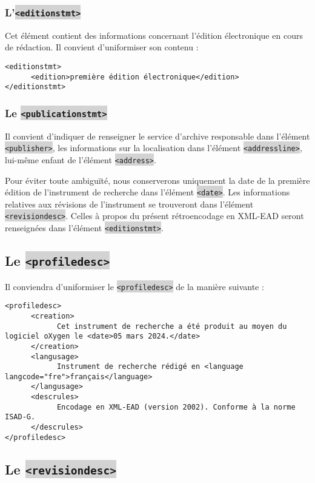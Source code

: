 \documentclass[hidelinks, 13pt]{report}
\newcommand{\code}[1]{\colorbox{LightGray}{\texttt{#1}}}
\begin{document}
	\subsubsection{L'\code{<editionstmt>}}

	Cet élément contient des informations concernant l'édition électronique en cours de rédaction. Il convient d'uniformiser son contenu :
	
\begin{lstlisting}[language=EAD]
<editionstmt>
      <edition>première édition électronique</edition>
</editionstmt>
\end{lstlisting}

	\subsubsection{Le \code{<publicationstmt>}}

	Il convient d'indiquer de renseigner le service d'archive responsable dans l'élément \code{<publisher>}, les informations sur la localisation dans l'élément \code{<addressline>}, lui-même enfant de l'élément \code{<address>}.
	
	Pour éviter toute ambiguïté, nous conserverons uniquement la date de la première édition de l'instrument de recherche dans l'élément \code{<date>}. Les informations relatives aux révisions de l'instrument se trouveront dans l'élément \code{<revisiondesc>}. Celles à propos du présent rétroencodage en XML-EAD seront renseignées dans l'élément \code{<editionstmt>}.
	
	\subsection{Le \code{<profiledesc>}}
	
	Il conviendra d’uniformiser le \code{<profiledesc>} de la manière suivante :

\begin{lstlisting}[language=EAD]
<profiledesc>
      <creation>
            Cet instrument de recherche a été produit au moyen du logiciel oXygen le <date>05 mars 2024.</date>
      </creation>
      <langusage>
            Instrument de recherche rédigé en <language langcode="fre">français</language>
      </langusage>
      <descrules>
            Encodage en XML-EAD (version 2002). Conforme à la norme ISAD-G.
      </descrules>
</profiledesc>
\end{lstlisting}

	\subsection{Le \code{<revisiondesc>}}
	
\end{document}
